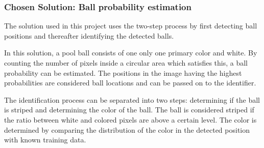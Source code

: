 \subsubsection{Chosen Solution: Ball probability estimation}
The solution used in this project uses the two-step process by first detecting ball positions and thereafter identifying the detected balls.

In this solution, a pool ball consists of one only one primary color and white. By counting the number of pixels inside a circular area which satisfies this, a ball probability can be estimated. The positions in the image having the highest probabilities are considered ball locations and can be passed on to the identifier.

The identification process can be separated into two steps: determining if the ball is striped and determining the color of the ball. The ball is considered striped if the ratio between white and colored pixels are above a certain level. The color is determined by comparing the distribution of the color in the detected position with known training data.